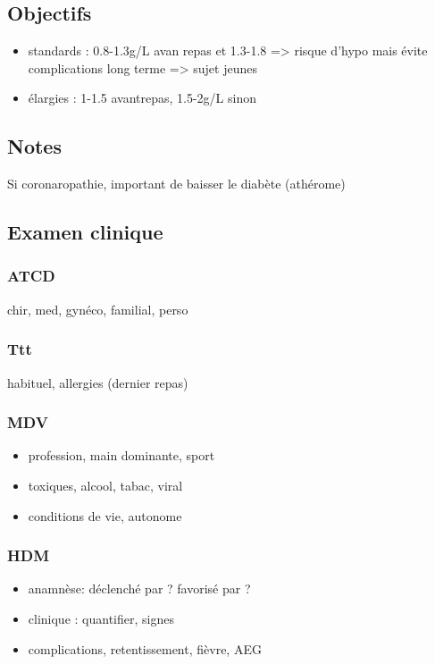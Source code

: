 \documentclass[11pt]{article}
\begin{document}
\subsection{Objectifs}
\label{sec:orgb5ecd7f}
\begin{itemize}
\item standards : 0.8-1.3g/L avan repas et 1.3-1.8 => risque d'hypo mais évite
complications long terme => sujet jeunes
\item élargies :  1-1.5 avantrepas, 1.5-2g/L sinon
\end{itemize}
\subsection{Notes}
\label{sec:org8faa4ab}
Si coronaropathie, important de baisser le diabète (athérome)
\subsection{Examen clinique}
\label{sec:org78b206c}
\subsubsection{ATCD}
\label{sec:org3bd873c}
chir, med, gynéco, familial, perso
\subsubsection{Ttt}
\label{sec:orgd272fd2}
habituel, allergies (dernier repas)
\subsubsection{MDV}
\label{sec:org5f660a2}
\begin{itemize}
\item profession, main dominante, sport
\item toxiques, alcool, tabac, viral
\item conditions de vie, autonome
\end{itemize}
\subsubsection{HDM}
\label{sec:org15728f8}
\begin{itemize}
\item anamnèse: déclenché par ? favorisé par ?
\item clinique : quantifier, signes
\item complications, retentissement, fièvre, AEG
\end{itemize}
\end{document}
